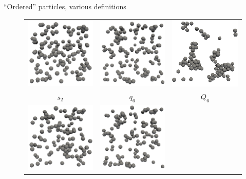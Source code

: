 \begin{frame}{``Ordered'' particles, various definitions}
\begin{figure}
	\begin{tabular}{ccc}
	\includegraphics[width=0.3\columnwidth]{s2_slice_3D}&%
	\includegraphics[width=0.3\columnwidth]{q6_slice_3D}&%
	\includegraphics[width=0.3\columnwidth]{Q6_slice_3D}\\ 
	$s_2$ & $q_6$ & $Q_6$ \\ 
	\includegraphics[width=0.3\columnwidth]{f2_slice_3D}&%
	\includegraphics[width=0.3\columnwidth]{w6_slice_3D}&%

\end{tabular}
\end{figure}
\end{frame}
